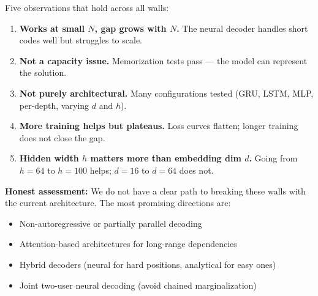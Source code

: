 \documentclass[11pt]{article}
\begin{document}
\noindent Five observations that hold across all walls:
\begin{enumerate}[nosep]
  \item \textbf{Works at small $N$, gap grows with $N$.} The neural decoder handles short codes well but struggles to scale.
  \item \textbf{Not a capacity issue.} Memorization tests pass --- the model can represent the solution.
  \item \textbf{Not purely architectural.} Many configurations tested (GRU, LSTM, MLP, per-depth, varying $d$ and $h$).
  \item \textbf{More training helps but plateaus.} Loss curves flatten; longer training does not close the gap.
  \item \textbf{Hidden width $h$ matters more than embedding dim $d$.} Going from $h = 64$ to $h = 100$ helps; $d = 16$ to $d = 64$ does not.
\end{enumerate}

\medskip
\noindent\textbf{Honest assessment:} We do not have a clear path to breaking these walls with the current architecture. The most promising directions are:
\begin{itemize}[nosep]
  \item Non-autoregressive or partially parallel decoding
  \item Attention-based architectures for long-range dependencies
  \item Hybrid decoders (neural for hard positions, analytical for easy ones)
  \item Joint two-user neural decoding (avoid chained marginalization)
\end{itemize}
\end{document}
